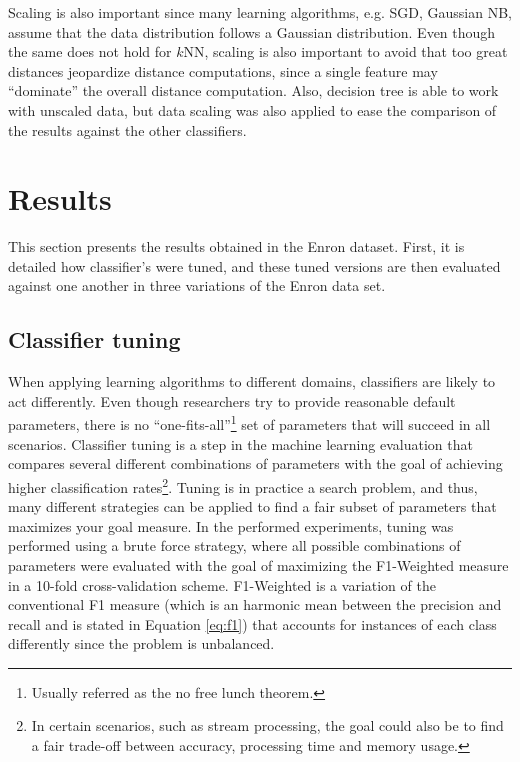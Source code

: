 \documentclass[11pt]{article}
\begin{document}
		Scaling is also important since many learning algorithms, e.g. SGD, Gaussian NB, assume that the data distribution follows a Gaussian distribution.
		Even though the same does not hold for $k$NN, scaling is also important to avoid that too great distances jeopardize distance computations, since a single feature may ``dominate'' the overall distance computation.
		Also, decision tree is able to work with unscaled data, but data scaling was also applied to ease the comparison of the results against the other classifiers.		
		
\section{Results} \label{sec:results}

	This section presents the results obtained in the Enron dataset.
	First, it is detailed how classifier's were tuned, and these tuned versions are then evaluated against one another in three variations of the Enron data set.

	\subsection{Classifier tuning}
	
	
		When applying learning algorithms to different domains, classifiers are likely to act differently.
		Even though researchers try to provide reasonable default parameters, there is no ``one-fits-all''\footnote{Usually referred as the no free lunch theorem.} set of parameters that will succeed in all scenarios.
		Classifier tuning is a step in the machine learning evaluation that compares several different combinations of parameters with the goal of achieving higher classification rates\footnote{In certain scenarios, such as stream processing, the goal could also be to find a fair trade-off between accuracy, processing time and memory usage.}.
		Tuning is in practice a search problem, and thus, many different strategies can be applied to find a fair subset of parameters that maximizes your goal measure.
		In the performed experiments, tuning was performed using a brute force strategy, where all possible combinations of parameters were evaluated with the goal of maximizing the F1-Weighted measure in a 10-fold cross-validation scheme.
		F1-Weighted is a variation of the conventional F1 measure (which is an harmonic mean between the precision and recall and is stated in Equation \ref{eq:f1}) that accounts for instances of each class differently since the problem is unbalanced.
	
\end{document}
